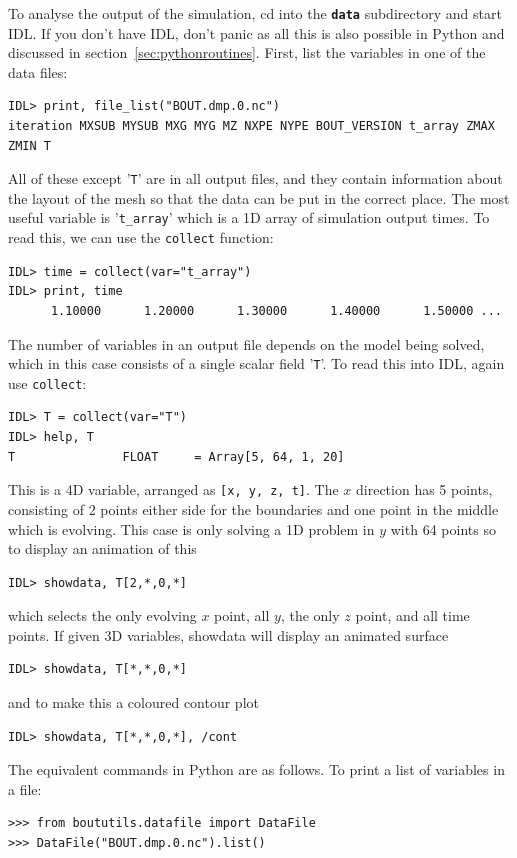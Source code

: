 \documentclass[12pt]{article}
\newcommand{\code}[1]{\texttt{#1}}
\newcommand{\file}[1]{\texttt{\bf #1}}
\begin{document}
To analyse the output of the simulation, cd into the \file{data} subdirectory
and start IDL.  If you don't have IDL, don't panic as all this is also possible
in Python and discussed in section~\ref{sec:pythonroutines}. First, list the
variables in one of the data files:
%
\begin{verbatim}
IDL> print, file_list("BOUT.dmp.0.nc")
iteration MXSUB MYSUB MXG MYG MZ NXPE NYPE BOUT_VERSION t_array ZMAX ZMIN T
\end{verbatim}
%
All of these except '\code{T}' are in all output files, and they contain
information about the layout of the mesh so that the data can be put in the
correct place. The most useful variable is '\code{t\_array}' which is a 1D
array of simulation output times. To read this, we can use the \code{collect}
function:
%
\begin{verbatim}
IDL> time = collect(var="t_array")
IDL> print, time
      1.10000      1.20000      1.30000      1.40000      1.50000 ...
\end{verbatim}
%
The number of variables in an output file depends on the model being solved,
which in this case consists of a single scalar field '\code{T}'. To read this
into IDL, again use \code{collect}:
%
\begin{verbatim}
IDL> T = collect(var="T")
IDL> help, T
T               FLOAT     = Array[5, 64, 1, 20]
\end{verbatim}
%
This is a 4D variable, arranged as \code{[x, y, z, t]}. The $x$ direction has 5
points, consisting of 2 points either side for the boundaries and one point in
the middle which is evolving. This case is only solving a 1D problem in $y$
with 64 points so to display an animation of this
%
\begin{verbatim}
IDL> showdata, T[2,*,0,*]
\end{verbatim}
%
which selects the only evolving $x$ point, all $y$, the only $z$ point, and all
time points.  If given 3D variables, showdata will display an animated surface
%
\begin{verbatim}
IDL> showdata, T[*,*,0,*]
\end{verbatim}
%
and to make this a coloured contour plot
%
\begin{verbatim}
IDL> showdata, T[*,*,0,*], /cont
\end{verbatim}
%
The equivalent commands in Python are as follows. To print a list of variables
in a file:
%
\begin{verbatim}
>>> from boututils.datafile import DataFile
>>> DataFile("BOUT.dmp.0.nc").list()
\end{verbatim}
\end{document}
